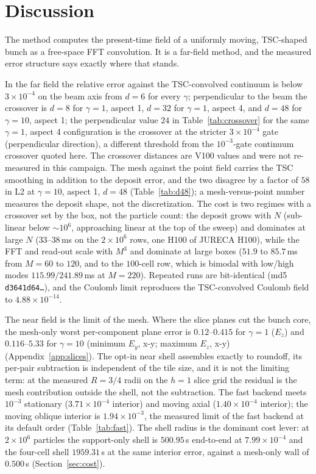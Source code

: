 \section{Discussion}
\label{sec:discussion}

The method computes the present-time field of a uniformly moving,
TSC-shaped bunch as a free-space FFT convolution. It is a far-field method,
and the measured error structure says exactly where that stands.

In the far field the relative error against the TSC-convolved continuum is
below $3\times10^{-4}$ on the beam axis from $d=6$ for every $\gamma$;
perpendicular to the beam the crossover is $d=8$ for $\gamma=1$, aspect 1,
$d=32$ for $\gamma=1$, aspect 4, and $d=48$ for $\gamma=10$, aspect 1; the
perpendicular value $24$ in Table~\ref{tab:crossover} for the same
$\gamma=1$, aspect 4 configuration is the crossover at the stricter
$3\!\times\!10^{-4}$ gate (perpendicular direction), a different
threshold from the $10^{-3}$-gate continuum crossover quoted here. The
crossover distances are V100 values and were not re-measured in this
campaign. The
mesh against the point field carries the TSC smoothing in addition to the
deposit error, and the two disagree by a factor of $58$ in L2 at
$\gamma=10$, aspect 1, $d=48$ (Table~\ref{tab:d48}); a
mesh-versus-point number measures the deposit shape, not the
discretization. The cost is two regimes with a crossover set by the box,
not the particle count: the deposit grows with $N$ (sub-linear below
$\sim10^6$, approaching linear at the top of the sweep) and dominates at
large $N$ ($33$--$38$\,ms on the $2\times10^{6}$ rows, one H100 of
JURECA H100), while the FFT and
read-out scale with $M^3$ and dominate at large boxes ($51.9$ to
$85.7$\,ms from $M=60$ to $120$, and to the $100$-cell row, which is bimodal
with low/high modes $115.99/241.89$\,ms at $M=220$). Repeated runs are
bit-identical (md5
\texttt{d3641d64\ldots}), and the Coulomb limit reproduces the
TSC-convolved Coulomb field to $4.88\times10^{-14}$.

The near field is the limit of the mesh. Where the slice planes cut the
bunch core, the mesh-only worst per-component plane error is
$0.12$--$0.415$ for $\gamma=1$ ($E_z$) and $0.116$--$5.33$ for $\gamma=10$
(minimum $E_y$, x-y; maximum $E_z$, x-y) (Appendix~\ref{app:slices}). The
opt-in near shell assembles exactly to
roundoff, its per-pair subtraction is independent of the tile size, and
it is not the limiting term: at the
measured $R=3/4$ radii on the $h=1$ slice grid the residual is the mesh
contribution outside the shell, not the subtraction. The fast backend
meets $10^{-3}$ stationary ($3.71\times10^{-4}$ interior) and moving axial
($1.40\times10^{-4}$ interior); the moving oblique interior is
$1.94\times10^{-3}$, the measured limit of the fast backend at its default
order (Table~\ref{tab:fast}). The shell radius is the dominant cost lever:
at $2\times10^{6}$ particles the support-only shell is $500.95$\,s
end-to-end at $7.99\times10^{-4}$ and the four-cell shell $1959.31$\,s at
the same interior error, against a mesh-only wall of $0.500$\,s
(Section~\ref{sec:cost}).

